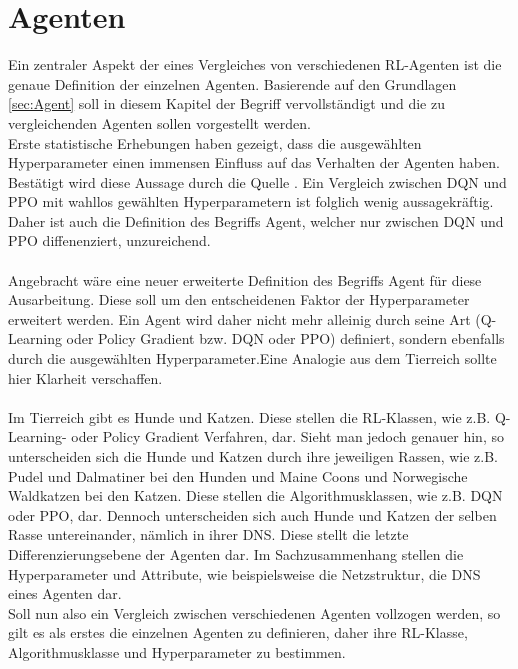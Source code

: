 \chapter{Agenten}
Ein zentraler Aspekt der eines Vergleiches von verschiedenen RL-Agenten ist die genaue Definition der einzelnen Agenten. Basierende auf den Grundlagen \ref{sec:Agent} soll in diesem Kapitel der Begriff vervollständigt und die zu vergleichenden Agenten sollen vorgestellt werden.\\
Erste statistische Erhebungen haben gezeigt, dass die ausgewählten Hyperparameter einen immensen Einfluss auf das Verhalten der Agenten haben. Bestätigt wird diese Aussage durch die Quelle \cite{Sutton1998}. Ein Vergleich zwischen DQN und PPO mit wahllos gewählten Hyperparametern ist folglich wenig aussagekräftig. Daher ist auch die Definition des Begriffs Agent, welcher nur zwischen DQN und PPO diffenenziert, unzureichend.\\
\\Angebracht wäre eine neuer erweiterte Definition des Begriffs Agent für diese Ausarbeitung. Diese soll um den entscheidenen Faktor der Hyperparameter erweitert werden. Ein Agent wird daher nicht mehr alleinig durch seine Art (Q-Learning oder Policy Gradient bzw. DQN oder PPO) definiert, sondern ebenfalls durch die ausgewählten Hyperparameter.Eine Analogie aus dem Tierreich sollte hier Klarheit verschaffen.\\
\\Im Tierreich gibt es Hunde und Katzen. Diese stellen die RL-Klassen, wie z.B. Q-Learning- oder Policy Gradient Verfahren, dar. Sieht man jedoch genauer hin, so unterscheiden sich die Hunde und Katzen durch ihre jeweiligen Rassen, wie z.B. Pudel und Dalmatiner bei den Hunden und Maine Coons und Norwegische Waldkatzen bei den Katzen. Diese stellen die Algorithmusklassen, wie z.B. DQN oder PPO, dar. Dennoch unterscheiden sich auch Hunde und Katzen der selben Rasse untereinander, nämlich in ihrer DNS. Diese stellt die letzte Differenzierungsebene der Agenten dar. Im Sachzusammenhang stellen die Hyperparameter und Attribute, wie beispielsweise die Netzstruktur, die DNS eines Agenten dar.\\
Soll nun also ein Vergleich zwischen verschiedenen Agenten vollzogen werden, so gilt es als erstes die einzelnen Agenten zu definieren, daher ihre RL-Klasse, Algorithmusklasse und Hyperparameter zu bestimmen.
 